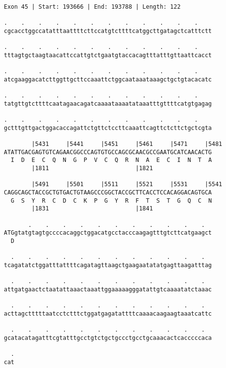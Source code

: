 \documentclass{article}
\begin{document}
\begin{Verbatim}
Exon 45 | Start: 193666 | End: 193788 | Length: 122
 
.    .    .    .    .    .    .    .    .    .    .    .    
cgcacctggccatatttaattttcttccatgtcttttcatggcttgatagctcatttctt
  
.    .    .    .    .    .    .    .    .    .    .    .    
tttagtgctaagtaacattccattgtctgaatgtaccacagtttatttgttaattcacct
  
.    .    .    .    .    .    .    .    .    .    .    .    
atcgaaggacatcttggttgcttccaaattctggcaataaataaagctgctgtacacatc
  
.    .    .    .    .    .    .    .    .    .    .    .    
tatgttgtcttttcaatagaacagatcaaaataaaatataaatttgttttcatgtgagag
  
.    .    .    .    .    .    .    .    .    .    .    .    
gctttgttgactggacaccagattctgttctccttcaaattcagttctcttctgctcgta
  
        |5431     |5441     |5451     |5461     |5471     |5481
ATATTGACGAGTGTCAGAACGGCCCAGTGTGCCAGCGCAACGCCGAATGCATCAACACTG
  I  D  E  C  Q  N  G  P  V  C  Q  R  N  A  E  C  I  N  T  A
        |1811                         |1821                 
  
        |5491     |5501     |5511     |5521     |5531     |5541
CAGGCAGCTACCGCTGTGACTGTAAGCCCGGCTACCGCTTCACCTCCACAGGACAGTGCA
  G  S  Y  R  C  D  C  K  P  G  Y  R  F  T  S  T  G  Q  C  N
        |1831                         |1841                 
  
       .    .    .    .    .    .    .    .    .    .    .  
ATGgtatgtagtgccccacaggctggacatgcctacccaagagtttgtcttcatgaagct
  D                                                         
  
  .    .    .    .    .    .    .    .    .    .    .    .  
tcagatatctggatttattttcagatagttaagctgaagaatatatgagttaagatttag
  
  .    .    .    .    .    .    .    .    .    .    .    .  
attgatgaactctaatattaaactaaattggaaaaagggatattgtcaaaatatctaaac
  
  .    .    .    .    .    .    .    .    .    .    .    .  
acttagctttttaatcctctttctggatgagatattttcaaaacaagaagtaaatcattc
  
  .    .    .    .    .    .    .    .    .    .    .    .  
gcatacatagatttcgtatttgcctgtctgctgccctgcctgcaaacactcacccccaca
  
  .
cat
\end{Verbatim}
\newpage
\end{document}
